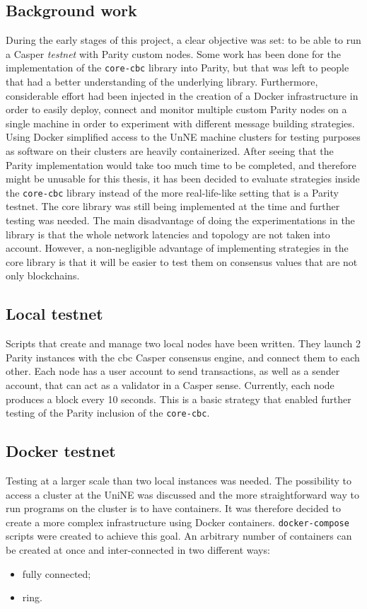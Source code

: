 \subsection{Background work}
During the early stages of this project, a clear objective was set: to be able
to run a Casper \textit{testnet} with Parity custom nodes. Some work has been
done for the implementation of the \texttt{core-cbc} library into Parity, but
that was left to people that had a better understanding of the underlying
library. Furthermore, considerable effort had been injected in the creation of a
Docker infrastructure in order to easily deploy, connect and monitor multiple
custom Parity nodes on a single machine in order to experiment with different
message building strategies. Using Docker simplified access to the UnNE machine
clusters for testing purposes as software on their clusters are heavily
containerized. After seeing that the Parity implementation would take too much
time to be completed, and therefore might be unusable for this thesis, it has
been decided to evaluate strategies inside the \texttt{core-cbc} library instead
of the more real-life-like setting that is a Parity testnet. The core library
was still being implemented at the time and further testing was needed.  The
main disadvantage of doing the experimentations in the library is that the whole
network latencies and topology are not taken into account. However, a
non-negligible advantage of implementing strategies in the core library is that
it will be easier to test them on consensus values that are not only
blockchains.

\subsection{Local testnet}
Scripts that create and manage two local nodes have been written. They launch 2
Parity instances with the \gls{cbc} Casper consensus engine, and connect them
to each other. Each node has a user account to send transactions, as well as a
sender account, that can act as a validator in a Casper sense. Currently, each
node produces a block every 10 seconds. This is a basic strategy that enabled
further testing of the Parity inclusion of the \texttt{core-cbc}.

\subsection{Docker testnet}
Testing at a larger scale than two local instances was needed. The possibility
to access a cluster at the UniNE was discussed and the more straightforward way
to run programs on the cluster is to have containers. It was therefore decided
to create a more complex infrastructure using Docker containers.
\texttt{docker-compose} scripts were created to achieve this goal. An arbitrary
number of containers can be created at once and inter-connected in two different
ways:
\begin{itemize}
    \item fully connected;
    \item ring.
\end{itemize}

